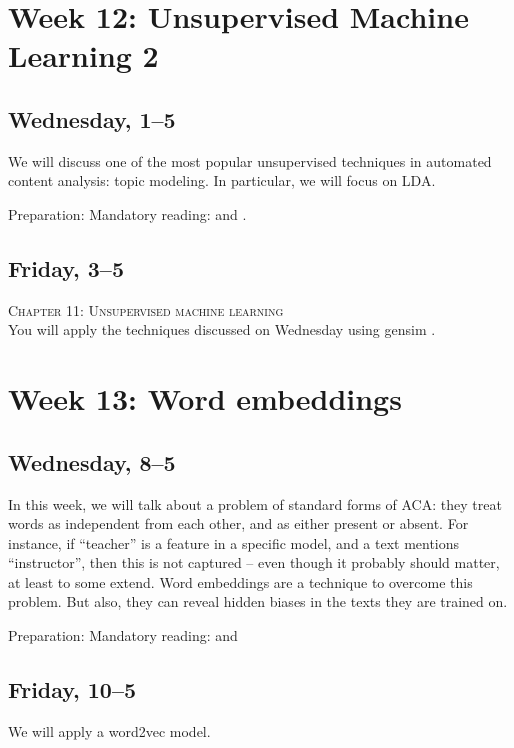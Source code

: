 \documentclass[a4paper,10pt]{report}
\begin{document}
\section*{Week 12: Unsupervised Machine Learning 2}


\subsection*{Wednesday, 1--5}
We will discuss one of the most popular unsupervised techniques in automated content analysis: topic modeling. In particular, we will focus on LDA.

Preparation: Mandatory reading: \citealp{Maier2018a} and \citealp{Tsur2015}. 

\subsection*{Friday, 3--5}
\textsc{ Chapter 11: Unsupervised machine learning}\\
You will apply the techniques discussed on Wednesday using gensim \citep{Rehurek2010}.



\section*{Week 13: Word embeddings}

\subsection*{Wednesday, 8--5}
In this week, we will talk about a problem of standard forms of ACA: they treat words as independent from each other, and as either present or absent. For instance, if ``teacher'' is a feature in a specific model, and a text mentions ``instructor'', then this is not captured -- even though it probably should matter, at least to some extend. Word embeddings are a technique to overcome this problem. But also, they can reveal hidden biases in the texts they are trained on.

Preparation: Mandatory reading: \citealp{Kusner2015} and \citealp{Garg2017}



\subsection*{Friday, 10--5}
We will apply a word2vec model.
\end{document}
